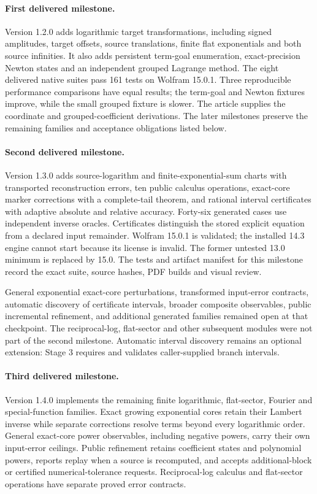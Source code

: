\documentclass[11pt,a4paper]{article}
\begin{document}
\paragraph{First delivered milestone.}
Version 1.2.0 adds logarithmic target transformations, including signed
amplitudes, target offsets, source translations, finite flat exponentials and
both source infinities. It also adds persistent term-goal enumeration,
exact-precision Newton states and an independent grouped Lagrange method.
The eight delivered native suites pass 161 tests on Wolfram 15.0.1.
Three reproducible performance comparisons have equal results; the term-goal
and Newton fixtures improve, while the small grouped fixture is slower.
The article supplies the coordinate and grouped-coefficient derivations.
The later milestones preserve the remaining families and acceptance
obligations listed below.

\paragraph{Second delivered milestone.}
Version 1.3.0 adds source-logarithm and finite-exponential-sum charts with
transported reconstruction errors, ten public calculus operations,
exact-core marker corrections with a complete-tail theorem, and rational
interval certificates with adaptive absolute and relative accuracy.
Forty-six generated cases use independent inverse oracles. Certificates
distinguish the stored explicit equation from a declared input remainder.
Wolfram 15.0.1 is validated; the installed 14.3 engine cannot start because
its license is invalid. The former untested 13.0 minimum is replaced by 15.0.
The tests and artifact manifest for this milestone record the exact suite,
source hashes, PDF builds and visual review.

General exponential exact-core perturbations, transformed input-error
contracts, automatic discovery of certificate intervals, broader composite
observables, public incremental refinement, and additional generated
families remained open at that checkpoint. The reciprocal-log, flat-sector
and other subsequent modules were not part of the second milestone.
Automatic interval discovery remains an optional extension: Stage 3
requires and validates caller-supplied branch intervals.

\paragraph{Third delivered milestone.}
Version 1.4.0 implements the remaining finite logarithmic, flat-sector,
Fourier and special-function families. Exact growing exponential cores
retain their Lambert inverse while separate corrections resolve terms
beyond every logarithmic order. General exact-core power observables,
including negative powers, carry their own input-error ceilings.
Public refinement retains coefficient states and polynomial powers,
reports replay when a source is recomputed, and accepts additional-block
or certified numerical-tolerance requests. Reciprocal-log calculus and
flat-sector operations have separate proved error contracts.
\end{document}
